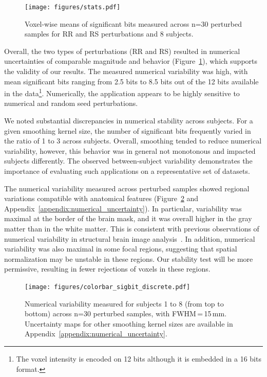 \documentclass[lettersize,journal]{IEEEtran}
\begin{document}
{\begin{figure}
  \centering
  \texttt{[image: figures/stats.pdf]}
  \caption{Voxel-wise means of significant bits
    measured across n=30 perturbed samples for RR and RS perturbations and 8
    subjects.}
  \label{fig:significant-digits}
\end{figure}
Overall, the two types of perturbations (RR and RS) resulted in numerical uncertainties of comparable magnitude and behavior (Figure~\ref{fig:significant-digits}), which supports the validity of our results. The measured numerical variability was high, with mean significant bits ranging from 2.5 bits to 8.5 bits out of the 12 bits available in the data\footnote{The voxel intensity is encoded on 12 bits although it is embedded in a 16 bits format.}. Numerically, the application appears to be highly sensitive to numerical and random seed perturbations.

We noted substantial discrepancies in numerical stability across subjects. For a given smoothing kernel size, the number of significant bits frequently varied in the ratio of 1 to 3 across subjects. Overall, smoothing tended to reduce numerical variability, however, this behavior was in general not monotonous and impacted subjects differently. The observed between-subject variability
demonstrates the importance of evaluating such applications on a representative set of datasets.

The numerical variability measured across perturbed samples showed regional variations compatible with anatomical features (Figure~\ref{fig:uncertainty-maps} and Appendix~\ref{appendix:numerical_uncertainty}). In particular, variability was
maximal at the border of the brain mask, and it was overall higher in the gray matter than in the white matter.
This is consistent with previous observations of numerical variability in structural brain image analysis~\cite{salari2021accurate}.
In addition, numerical variability was also maximal in some focal regions, suggesting that spatial normalization may be unstable in these regions.
Our stability test will be more permissive, resulting in fewer rejections of voxels in these regions.

\begin{figure}
  \vspace*{-20pt}\hspace{15pt}
  \texttt{[image: figures/colorbar\_sigbit\_discrete.pdf]}
  \caption{Numerical variability measured for subjects 1 to 8 (from top to bottom) across n=30 perturbed samples, with FWHM\,=\,15\,mm. Uncertainty maps for other smoothing kernel sizes are available in Appendix~\ref{appendix:numerical_uncertainty}.}
  \label{fig:uncertainty-maps}
\end{figure}

}
\end{document}
